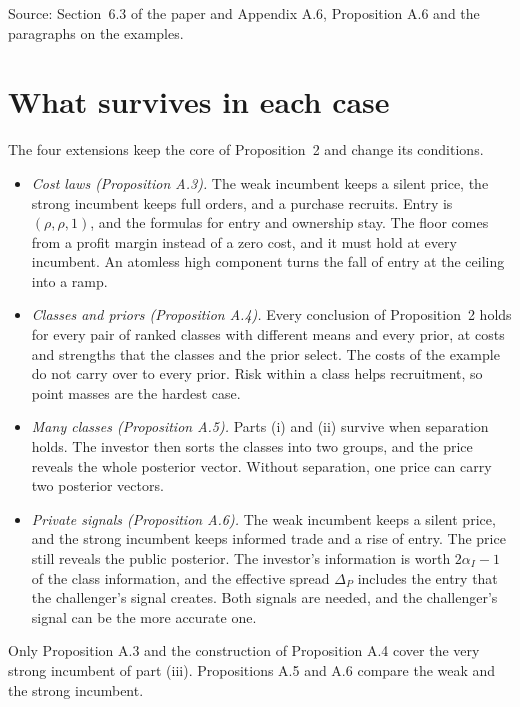 {\small\color{notegrey}Source: Section~6.3 of the paper and Appendix A.6, Proposition A.6 and the paragraphs on the examples.}

\section{What survives in each case}\label{sec:robustness-survives}

The four extensions keep the core of Proposition~2 and change its conditions.
\begin{itemize}
\item \emph{Cost laws (Proposition A.3).} The weak incumbent keeps a silent price, the strong incumbent keeps full orders, and a purchase recruits. Entry is \((\rho,\rho,1)\), and the formulas for entry and ownership stay. The floor comes from a profit margin instead of a zero cost, and it must hold at every incumbent. An atomless high component turns the fall of entry at the ceiling into a ramp.
\item \emph{Classes and priors (Proposition A.4).} Every conclusion of Proposition~2 holds for every pair of ranked classes with different means and every prior, at costs and strengths that the classes and the prior select. The costs of the example do not carry over to every prior. Risk within a class helps recruitment, so point masses are the hardest case.
\item \emph{Many classes (Proposition A.5).} Parts (i) and (ii) survive when separation holds. The investor then sorts the classes into two groups, and the price reveals the whole posterior vector. Without separation, one price can carry two posterior vectors.
\item \emph{Private signals (Proposition A.6).} The weak incumbent keeps a silent price, and the strong incumbent keeps informed trade and a rise of entry. The price still reveals the public posterior. The investor's information is worth \(2\alpha_I-1\) of the class information, and the effective spread \(\Delta_P\) includes the entry that the challenger's signal creates. Both signals are needed, and the challenger's signal can be the more accurate one.
\end{itemize}
Only Proposition A.3 and the construction of Proposition A.4 cover the very strong incumbent of part (iii). Propositions A.5 and A.6 compare the weak and the strong incumbent.

